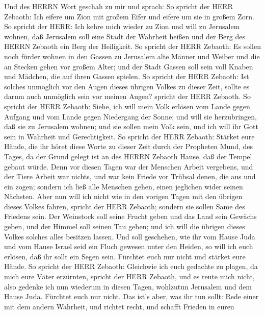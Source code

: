  Und des HERRN Wort geschah zu mir und sprach: 
So spricht der HERR Zebaoth: Ich eifere um Zion mit großem Eifer und
eifere um sie in großem Zorn.  So spricht der HERR: Ich
kehre mich wieder zu Zion und will zu Jerusalem wohnen, daß Jerusalem
soll eine Stadt der Wahrheit heißen und der Berg des HERRN Zebaoth ein
Berg der Heiligkeit.  So spricht der HERR Zebaoth: Es sollen
noch fürder wohnen in den Gassen zu Jerusalem alte Männer und Weiber und
die an Stecken gehen vor großem Alter;  und der Stadt Gassen
soll sein voll Knaben und Mädchen, die auf ihren Gassen spielen.
 So spricht der HERR Zebaoth: Ist solches unmöglich vor den
Augen dieses übrigen Volkes zu dieser Zeit, sollte es darum auch
unmöglich sein vor meinen Augen? spricht der HERR Zebaoth. 
So spricht der HERR Zebaoth: Siehe, ich will mein Volk erlösen vom Lande
gegen Aufgang und vom Lande gegen Niedergang der Sonne;  und
will sie herzubringen, daß sie zu Jerusalem wohnen; und sie sollen mein
Volk sein, und ich will ihr Gott sein in Wahrheit und Gerechtigkeit.
 So spricht der HERR Zebaoth: Stärket eure Hände, die ihr
höret diese Worte zu dieser Zeit durch der Propheten Mund, des Tages, da
der Grund gelegt ist an des HERRN Zebaoth Hause, daß der Tempel gebaut
würde.  Denn vor diesen Tagen war der Menschen Arbeit
vergebens, und der Tiere Arbeit war nichts, und war kein Friede vor
Trübsal denen, die aus und ein zogen; sondern ich ließ alle Menschen
gehen, einen jeglichen wider seinen Nächsten.  Aber nun
will ich nicht wie in den vorigen Tagen mit den übrigen dieses Volkes
fahren, spricht der HERR Zebaoth;  sondern sie sollen Same
des Friedens sein. Der Weinstock soll seine Frucht geben und das Land
sein Gewächs geben, und der Himmel soll seinen Tau geben; und ich will
die übrigen dieses Volkes solches alles besitzen lassen. 
Und soll geschehen, wie ihr vom Hause Juda und vom Hause Israel seid ein
Fluch gewesen unter den Heiden, so will ich euch erlösen, daß ihr sollt
ein Segen sein. Fürchtet euch nur nicht und stärket eure Hände.
 So spricht der HERR Zebaoth: Gleichwie ich euch gedachte
zu plagen, da mich eure Väter erzürnten, spricht der HERR Zebaoth, und
es reute mich nicht,  also gedenke ich nun wiederum in
diesen Tagen, wohlzutun Jerusalem und dem Hause Juda. Fürchtet euch nur
nicht.  Das ist's aber, was ihr tun sollt: Rede einer mit
dem andern Wahrheit, und richtet recht, und schafft Frieden in euren
